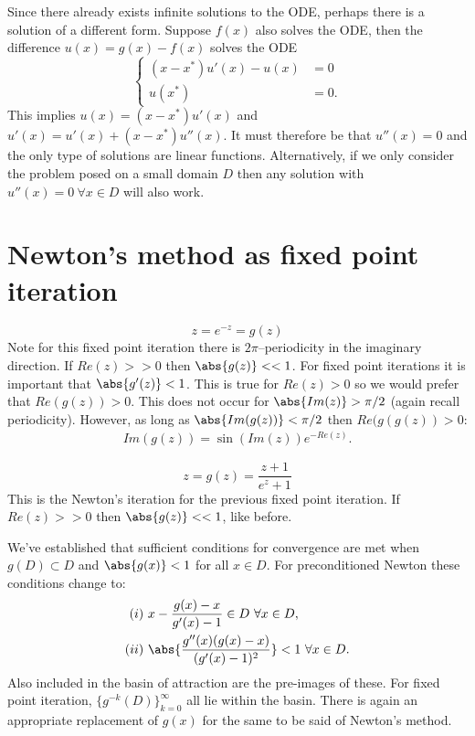 \documentclass{book}
\begin{document}
Since there already exists infinite solutions to the ODE, perhaps there is a solution of a different form.
Suppose $f(x)$ also solves the ODE, then the difference $u(x) = g(x) - f(x)$ solves the ODE
\begin{equation*}
\begin{cases} (x - x^*)u'(x) - u(x) & = 0 \\ u(x^*) & = 0. \end{cases}
\end{equation*}
This implies $u(x) = (x - x^*) u'(x)$ and $u'(x) = u'(x) + (x - x^*) u''(x)$.
It must therefore be that $u''(x) = 0$ and the only type of solutions are linear functions.
Alternatively, if we only consider the problem posed on a small domain $D$ then any solution with $u''(x) = 0 \ \forall x \in D$ will also work.

\section{Newton's method as fixed point iteration}

\begin{equation*}
z = e^{-z} = g(z)
\end{equation*}
Note for this fixed point iteration there is $2 \pi$--periodicity in the imaginary direction.
If $Re(z)>>0$ then $\abs{g(z)}<<1$.
For fixed point iterations it is important that $\abs{g'(z)}<1$.
This is true for $Re(z)>0$ so we would prefer that $Re(g(z))>0$.
This does not occur for $\abs{Im(z)}>\pi/2$ (again recall periodicity).
However, as long as $\abs{Im(g(z))}<\pi/2$ then $Re(g(g(z))>0$:
\begin{align*}
Im(g(z)) = \sin \left ( Im(z) \right ) e^{-Re(z)} .
\end{align*}

\begin{equation*}
z = g(z) = \frac{z + 1}{e^z + 1}
\end{equation*}
This is the Newton's iteration for the previous fixed point iteration.
If $Re(z)>>0$ then $\abs{g(z)}<<1$, like before.

We've established that sufficient conditions for convergence are met when $g(D) \subset D$ and $\abs{g(x)} < 1$ for all $x \in D$.
For preconditioned Newton these conditions change to:
\begin{align*}
(i) & \ x - \frac{g(x) - x}{g'(x) - 1} \in D \ \forall x \in D, \\
(ii) & \ \abs{ \frac{g''(x) (g(x) - x) }{(g'(x) - 1)^2} } < 1 \ \forall x \in D.
\end{align*}
Also included in the basin of attraction are the pre-images of these.
For fixed point iteration, $\{g^{-k}(D)\}_{k=0}^\infty$ all lie within the basin.
There is again an appropriate replacement of $g(x)$ for the same to be said of Newton's method.
\end{document}
